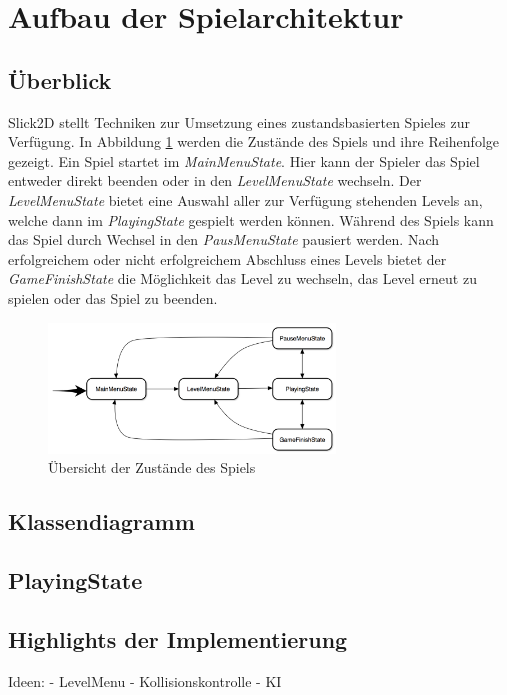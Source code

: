 \section{Aufbau der Spielarchitektur}

\subsection{Überblick}

Slick2D stellt Techniken zur Umsetzung eines zustandsbasierten Spieles zur Verfügung.
In Abbildung \ref{fig:spielarchitektur:states} werden die Zustände des Spiels und ihre Reihenfolge gezeigt.
Ein Spiel startet im \textit{MainMenuState}.
Hier kann der Spieler das Spiel entweder direkt beenden oder in den \textit{LevelMenuState} wechseln.
Der \textit{LevelMenuState} bietet eine Auswahl aller zur Verfügung stehenden Levels an, welche dann im \textit{PlayingState} gespielt werden können.
Während des Spiels kann das Spiel durch Wechsel in den \textit{PausMenuState} pausiert werden.
Nach erfolgreichem oder nicht erfolgreichem Abschluss eines Levels bietet der \textit{GameFinishState} die Möglichkeit das Level zu wechseln, das Level erneut zu spielen oder das Spiel zu beenden.

\begin{figure}[]
\centering
\includegraphics[width=3in]{img/05_states.png}
\caption{Übersicht der Zustände des Spiels}
\label{fig:spielarchitektur:states}
\end{figure}



\subsection{Klassendiagramm}


\subsection{PlayingState}

\subsection{Highlights der Implementierung}

Ideen:
- LevelMenu
- Kollisionskontrolle
- KI